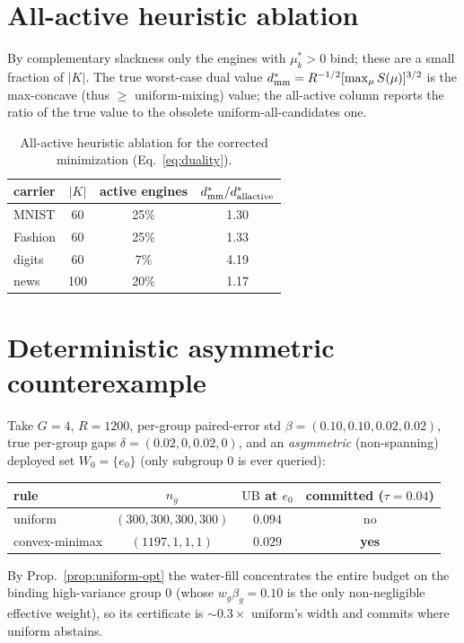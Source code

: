 \documentclass{article}
\begin{document}
\section{All-active heuristic ablation}
\label{app:m35}
By complementary slackness only the engines with $\mu^*_k>0$ bind; these are a small fraction
of $|K|$. The true worst-case dual value $d^*_{\rm mm}=R^{-1/2}[\max_\mu S(\mu)]^{3/2}$ is the
max-concave (thus $\ge$ uniform-mixing) value; the all-active column reports the ratio of the
true value to the obsolete uniform-all-candidates one.
\begin{table}[h]
\centering\small\setlength{\tabcolsep}{4pt}
\begin{tabular}{lccc}
\toprule
carrier & $|K|$ & active engines & $d^*_{\rm mm}/d^*_{\rm allactive}$ \\
\midrule
MNIST & 60 & 25\% & 1.30 \\
Fashion & 60 & 25\% & 1.33 \\
digits & 60 & 7\% & 4.19 \\
news & 100 & 20\% & 1.17 \\
\bottomrule
\end{tabular}
\caption{All-active heuristic ablation for the corrected minimization (Eq.~\ref{eq:duality}).}
\label{tab:m35ab}
\end{table}

\section{Deterministic asymmetric counterexample}
\label{app:counter}
Take $G{=}4$, $R{=}1200$, per-group paired-error std $\beta=(0.10,0.10,0.02,0.02)$, true
per-group gaps $\delta=(0.02,0,0.02,0)$, and an \emph{asymmetric} (non-spanning) deployed set
$W_0=\{e_0\}$ (only subgroup $0$ is ever queried):
\begin{center}
\begin{tabular}{lccc}
\toprule
rule & $n_g$ & $\mathrm{UB}$ at $e_0$ & committed ($\tau{=}0.04$) \\
\midrule
uniform & $(300,300,300,300)$ & $0.094$ & no \\
convex-minimax & $(1197,1,1,1)$ & $0.029$ & \textbf{yes} \\
\bottomrule
\end{tabular}
\end{center}
By Prop.~\ref{prop:uniform-opt} the water-fill concentrates the entire budget on the binding
high-variance group $0$ (whose $w_g\beta_g{=}0.10$ is the only non-negligible effective
weight), so its certificate is $\sim0.3\times$ uniform's width and commits where uniform
abstains.
\end{document}
